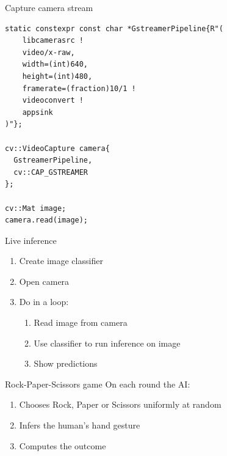 \begin{frame}[fragile]{Capture camera stream}
  \lstset{basicstyle=\ttfamily\small, showstringspaces=false, numbers=left,
  columns=fullflexible}
  \begin{lstlisting}
static constexpr const char *GstreamerPipeline{R"(
    libcamerasrc !
    video/x-raw,
    width=(int)640,
    height=(int)480,
    framerate=(fraction)10/1 !
    videoconvert !
    appsink
)"};

cv::VideoCapture camera{
  GstreamerPipeline,
  cv::CAP_GSTREAMER
};

cv::Mat image;
camera.read(image);
  \end{lstlisting}
\end{frame}

\begin{frame}{Live inference}
  \begin{enumerate}
	\item Create image classifier
	\item Open camera
	\item Do in a loop:
	\begin{enumerate}
	  \item Read image from camera
	  \item Use classifier to run inference on image
	  \item Show predictions
	\end{enumerate}
  \end{enumerate}
\end{frame}

\begin{frame}{Rock-Paper-Scissors game}
On each round the AI:
  \begin{enumerate}
	\item Chooses Rock, Paper or Scissors uniformly at random
	\item Infers the human's hand gesture
	\item Computes the outcome
  \end{enumerate}
\end{frame}

